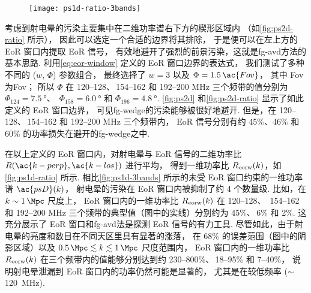\begin{figure}[htp]
  \centering
  \texttt{[image: ps1d-ratio-3bands]}
  \label{fig:ps1d-ratio}
\end{figure}

考虑到射电晕的污染主要集中在二维功率谱右下方的楔形区域内
（如\autoref{fig:ps2d-ratio} 所示），
因此可以选定一个合适的边界将其排除，
于是便可以在左上方的 EoR 窗口内提取 EoR 信号，
有效地避开了强烈的前景污染，这就是\ac{fg-avd}方法的基本思路.
利用\autoref{eq:eor-window} 定义的 EoR 窗口边界的表达式，
我们测试了多种不同的 ($w$, $\Phi$) 参数组合，
最终选择了 $w = 3$ 以及 $\Phi = 1.5\,\ac{Fov}$，
其中 \ac{Fov} 为\acl{Fov}；
所以 $\Phi$ 在 \numrange{120}{128}、\,\numrange{154}{162}
和 \numrange{192}{200} \si{\MHz} 三个频带的值分别为
$\Phi_{124} = \SI{7.5}{\degree}$、\,
$\Phi_{158} = \SI{6.0}{\degree}$ 和
$\Phi_{196} = \SI{4.8}{\degree}$.
\autoref{fig:ps2d} 和\autoref{fig:ps2d-ratio} 显示了如此定义的 EoR 窗口边界，
可见\ac{fg-wedge}的污染能够被很好地避开.
但是，在 \numrange{120}{128}、\,\numrange{154}{162}
和 \numrange{192}{200} \si{\MHz} 三个频带内，
EoR 信号分别有约 45\%、46\% 和 60\% 的功率损失在避开的\ac{fg-wedge}之中.

在以上定义的 EoR 窗口内，对射电晕与 EoR 信号的二维功率比
$R(\ac{k-perp}, \ac{k-los})$ 进行平均，
得到一维功率比 $R_{\mathrm{eorw}}(k)$，如\autoref{fig:ps1d-ratio} 所示.
相比\autoref{fig:ps1d-3bands} 所示的未受 EoR 窗口约束的一维功率谱 $\ac{psD}(k)$，
射电晕的污染在 EoR 窗口内被抑制了约 4 个数量级.
比如，在 $k \sim \SI{1}{\per\Mpc}$ 尺度上，
EoR 窗口内的一维功率比 $R_{\mathrm{eorw}}(k)$ 在 \numrange{120}{128}、\,
\numrange{154}{162} 和 \numrange{192}{200} \si{\MHz}
三个频带的典型值（图中的实线）分别约为 45\%、\,6\% 和 2\%.
这充分展示了 EoR 窗口和\ac{fg-avd}法是探测 EoR 信号的有力工具.
尽管如此，由于射电晕的亮度和数目在不同天区里具有显著的涨落，
在 68\% 的误差范围（图中的阴影区域）以及
$\SI{0.5}{\per\Mpc} \lesssim k \lesssim \SI{1}{\per\Mpc}$ 尺度范围内，
EoR 窗口内的一维功率比 $R_{\mathrm{eorw}}(k)$ 在三个频带内的值能够分别达到约
\numrange{230}{800}\%、\,\numrange{18}{95}\% 和 \numrange{7}{40}\%，
说明射电晕泄漏到 EoR 窗口内的功率仍然可能是显著的，
尤其是在较低频率 ($\sim$\,\SI{120}{\MHz}).

